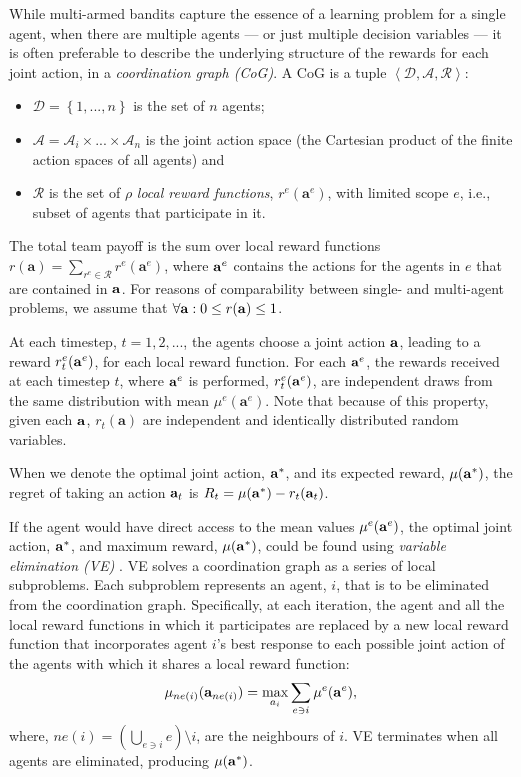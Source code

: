 \documentclass{article}
\begin{document}
While multi-armed bandits capture the essence of a learning problem for a single agent, when there are multiple agents --- or just multiple decision variables --- it is often preferable to describe the underlying structure of the rewards for each joint action, in a \emph{coordination graph (CoG)}.  A CoG is a tuple $\left< \mathcal{D}, \mathcal{A}, \mathcal{R}\right>$: 
\begin{itemize}
\item $\mathcal{D} = \left\{ 1, ... , n\right\}$ is the set of $n$ agents; 
\item $\mathcal{A} = \mathcal{A}_i \times ... \times \mathcal{A}_n$ is the joint action space (the Cartesian product of the finite action spaces of all agents) and 
\item $\mathcal{R}$ is the set of $\rho$ \emph{local reward functions}, ${r}^e(\mathbf{a}^e)$,  with limited {scope} $e$, i.e., subset of agents that participate in it.
\end{itemize}
The total team payoff is the sum over local reward functions ${r}(\mathbf{a}) = \sum_{r^e \in \mathcal{R}} r^e(\mathbf{a}^e)$, where ${\bf a}^e$ contains the actions for the agents in $e$ that are contained in $\bf a$. For reasons of comparability between single- and multi-agent problems, we assume that $\forall {\bf a} : 0\leq {r}(\mathbf{a})\leq 1$. 

At each timestep, $t=1,2,...$, the agents choose a joint action ${\bf a}$, leading to a reward $r_t^e({\bf a}^e)$, for each local reward function.  For each ${\bf a}^e$, the rewards received at each timestep $t$, where ${\bf a}^e$ is performed, $r^e_t({\bf a}^e)$,  are independent draws from the same distribution with mean ${\mu}^e(\mathbf{a}^e)$. Note that because of this property, given each $\bf a$, ${r}_t(\mathbf{a})$ are independent and identically distributed random variables. 

When we denote the optimal joint action, ${\bf a}^*$, and its expected reward, $\mu({\bf a}^*)$, the regret of taking an action ${\bf a}_t$ is $R_t = \mu({\bf a}^*) - r_t({\bf a}_t)$. 

If the agent would have direct access to the mean values $\mu^e({\bf a}^e)$, the optimal joint action, ${\bf a}^*$, and maximum reward, $\mu({\bf a}^*)$, could be found using \emph{variable elimination (VE)} \cite{rosenthal77nonserial,Guestrin02}. VE solves a coordination graph as a series of local subproblems. Each subproblem represents an agent, $i$, that is to be eliminated from the coordination graph. Specifically, at each iteration, the agent and all the local reward functions in which it participates are replaced by a new local reward function that incorporates agent $i$'s best response to each possible joint action of the agents with which it shares a local reward function:
\[
	\mu_{ne(i)}({\bf a}_{ne(i)}) = \max_{a_i} \sum_{e \ni i} \mu^e({\bf a}^e),
\]
where, $ne(i) = (\bigcup_{e\ni i} e) \setminus i$, are the neighbours of $i$. VE terminates when all agents are eliminated, producing $\mu({\bf a}^*)$.
\end{document}
